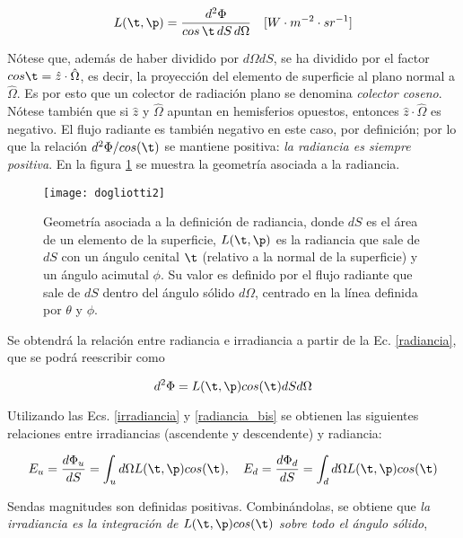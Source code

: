 \begin{equation}
 L(\t,\p)=\frac{d^{2}\Phi}{cos\,\t\,dS\,d\Omega}\quad [W\cdot m^{-2} \cdot sr^{-1}]
\label{radiancia}
\end{equation}

Nótese que, además de haber dividido por $d\Omega dS$, se ha dividido por el factor
$cos \t=\hat{z}\cdot \hat{\Omega}$, es decir, la proyección del elemento de superficie al plano
normal a $\hat{\Omega}$.
Es por esto que un colector de radiación plano se denomina \textit{colector coseno}.
Nótese también que si $\hat{z}$ y $\hat{\Omega}$ apuntan en hemisferios opuestos,
entonces $\hat{z}\cdot \hat{\Omega}$ es negativo.
El flujo radiante es también negativo en este caso, por definición; por lo que la relación
$d^{2}\Phi/cos(\t)$ se mantiene positiva: \textit{la radiancia es siempre positiva}.
En la figura \ref{fig:dogliotti2} se muestra la geometría asociada a la radiancia.

\begin{figure}
\centering
\texttt{[image: dogliotti2]}
\caption[Radiancia]{Geometría asociada a la definición de radiancia, donde $dS$ es
el área de un elemento de la superficie, $L(\t,\p)$ es la radiancia que sale de $dS$
con un ángulo cenital $\t$ (relativo a la normal de la superficie) y un ángulo acimutal $\phi$.
Su valor es definido por el flujo
radiante que sale de $dS$ dentro del ángulo sólido $d\Omega$,
centrado en la línea definida por $\theta$ y $\phi$.} 
\label{fig:dogliotti2}
\end{figure}

Se obtendrá la relación entre radiancia e irradiancia a partir de la Ec. \eqref{radiancia}, que se podrá reescribir como

\begin{equation}
 d^{2}\Phi=L(\t,\p)cos(\t) dS d\Omega
\label{radiancia_bis}
 \end{equation}

Utilizando las Ecs. \eqref{irradiancia} y \eqref{radiancia_bis} se obtienen
las siguientes relaciones entre irradiancias (ascendente y descendente) y radiancia:

\begin{equation}
 E_{u}=\frac{d\Phi_{u}}{dS}=\int_{u}d\Omega L(\t,\p)cos(\t),\quad  E_{d}=\frac{d\Phi_{d}}{dS}=\int_{d}d\Omega L(\t,\p)cos(\t)
\label{rad_irrad1}
 \end{equation}

Sendas magnitudes son definidas positivas. Combinándolas, se obtiene que \textit{la irradiancia es
la integración de $L(\t,\p)cos(\t)$ sobre todo el ángulo sólido},

